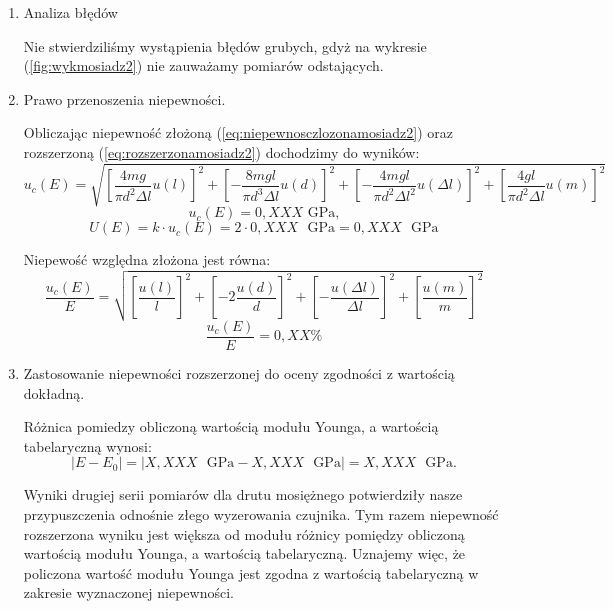 \documentclass [a4paper,11pt]{article}
\begin{document}
	\begin{enumerate}[label=\alph*)]
		\item Analiza błędów
		
		Nie stwierdziliśmy wystąpienia błędów grubych, gdyż na wykresie (\ref{fig:wykmosiadz2}) nie zauważamy pomiarów odstających.
		
		\item Prawo przenoszenia niepewności.
		
		Obliczając niepewność złożoną (\ref{eq:niepewnosczlozonamosiadz2}) oraz rozszerzoną (\ref{eq:rozszerzonamosiadz2}) dochodzimy do wyników: 
		\begin{equation}
		\label{eq:niepewnosczlozonamosiadz2}
		u_c(E) = \sqrt{ \left[ \frac{4mg}{\pi d^2\Delta l}u(l) \right]^2 + \left[ -\frac{8mgl}{\pi d^3\Delta l}u(d) \right]^2 + \left[ -\frac{4mgl}{\pi d^2\Delta l^2}u(\Delta l) \right]^2 + \left[ \frac{4gl}{\pi d^2\Delta l}u(m) \right]^2}
		\end{equation}
		$$ u_c(E) = 0,XXX \text{ GPa,} $$
		\begin{equation}
		\label{eq:rozszerzonamosiadz2}
		U(E) = k\cdot u_c(E) = 2 \cdot 0,XXX \text{ }\mathrm{GPa} = 0,XXX \text{ }\mathrm{GPa}
		\end{equation}
		
		Niepewość względna złożona jest równa:
		\begin{equation}
		\label{eq:niepewnosczlozonawzglmosiadz2}
		\frac{u_c(E)}{E} = \sqrt{ \left[ \frac{u(l)}{l} \right]^2 + \left[ -2\frac{u(d)}{d} \right]^2 + \left[ -\frac{u(\Delta l)}{\Delta l} \right]^2 + \left[ \frac{u(m)}{m} \right]^2}
		\end{equation}
		$$ \frac{u_c(E)}{E} = 0,XX\% $$
		
		\item Zastosowanie niepewności rozszerzonej do oceny zgodności z wartością dokładną.
		
		Różnica pomiedzy obliczoną wartością modułu Younga, a wartością tabelaryczną wynosi:
		\begin{equation}
		\label{eq:roznicamosiadz2}
		|E - E_0| = \left|X,XXX \text{ }\mathrm{GPa} - X,XXX \text{ }\mathrm{GPa}\right| = X,XXX \text{ }\mathrm{GPa}.
		\end{equation}
		
		Wyniki drugiej serii pomiarów dla drutu mosiężnego potwierdziły nasze przypuszczenia odnośnie złego wyzerowania czujnika. Tym razem niepewność rozszerzona wyniku jest większa od modułu różnicy pomiędzy obliczoną wartością modułu Younga, a wartością tabelaryczną. Uznajemy więc, że policzona wartość modułu Younga jest zgodna z wartością tabelaryczną w zakresie wyznaczonej niepewności.
		
	\end{enumerate}
\end{document}
